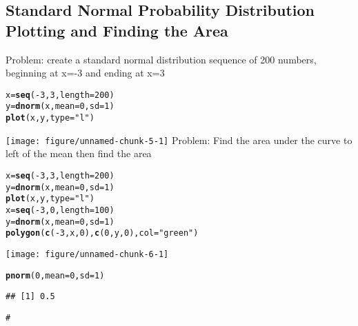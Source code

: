 \documentclass{article}\usepackage[]{graphicx}\usepackage[]{xcolor}
\makeatletter
\def\maxwidth{ %
  \ifdim\Gin@nat@width>\linewidth
    \linewidth
  \else
    \Gin@nat@width
  \fi
}
\newcommand{\hlnum}[1]{\textcolor[rgb]{0.686,0.059,0.569}{#1}}%
\newcommand{\hlsng}[1]{\textcolor[rgb]{0.192,0.494,0.8}{#1}}%
\newcommand{\hlcom}[1]{\textcolor[rgb]{0.678,0.584,0.686}{\textit{#1}}}%
\newcommand{\hlopt}[1]{\textcolor[rgb]{0,0,0}{#1}}%
\newcommand{\hldef}[1]{\textcolor[rgb]{0.345,0.345,0.345}{#1}}%
\newcommand{\hlkwb}[1]{\textcolor[rgb]{0.69,0.353,0.396}{#1}}%
\newcommand{\hlkwc}[1]{\textcolor[rgb]{0.333,0.667,0.333}{#1}}%
\newcommand{\hlkwd}[1]{\textcolor[rgb]{0.737,0.353,0.396}{\textbf{#1}}}%
\newenvironment{kframe}{%
 \def\at@end@of@kframe{}%
 \ifinner\ifhmode%
  \def\at@end@of@kframe{\end{minipage}}%
  \begin{minipage}{\columnwidth}%
 \fi\fi%
 \def\FrameCommand##1{\hskip\@totalleftmargin \hskip-\fboxsep
 \colorbox{shadecolor}{##1}\hskip-\fboxsep
     \hskip-\linewidth \hskip-\@totalleftmargin \hskip\columnwidth}%
 \MakeFramed {\advance\hsize-\width
   \@totalleftmargin\z@ \linewidth\hsize
   \@setminipage}}%
 {\par\unskip\endMakeFramed%
 \at@end@of@kframe}
\newenvironment{knitrout}{}{} %
\makeatother
\begin{document}
\subsection{Standard Normal Probability Distribution Plotting and Finding the Area}
Problem: \newline
create a standard normal distribution sequence of 200 numbers, beginning at x=-3 and ending at x=3
\begin{knitrout}
\color{fgcolor}\begin{kframe}
\begin{alltt}
\hldef{x}\hlkwb{=}\hlkwd{seq}\hldef{(}\hlopt{-}\hlnum{3}\hldef{,}\hlnum{3}\hldef{,}\hlkwc{length}\hldef{=}\hlnum{200}\hldef{)}
\hldef{y}\hlkwb{=}\hlkwd{dnorm}\hldef{(x,}\hlkwc{mean}\hldef{=}\hlnum{0}\hldef{,}\hlkwc{sd}\hldef{=}\hlnum{1}\hldef{)}
\hlkwd{plot}\hldef{(x,y,}\hlkwc{type}\hldef{=}\hlsng{"l"}\hldef{)}
\end{alltt}
\end{kframe}
\texttt{[image: figure/unnamed-chunk-5-1]} 
\end{knitrout}
Problem: \newline
Find the area under the curve to left of the mean then find the area
\begin{knitrout}
\color{fgcolor}\begin{kframe}
\begin{alltt}
\hldef{x}\hlkwb{=}\hlkwd{seq}\hldef{(}\hlopt{-}\hlnum{3}\hldef{,}\hlnum{3}\hldef{,}\hlkwc{length}\hldef{=}\hlnum{200}\hldef{)}
\hldef{y}\hlkwb{=}\hlkwd{dnorm}\hldef{(x,}\hlkwc{mean}\hldef{=}\hlnum{0}\hldef{,}\hlkwc{sd}\hldef{=}\hlnum{1}\hldef{)}
\hlkwd{plot}\hldef{(x,y,}\hlkwc{type}\hldef{=}\hlsng{"l"}\hldef{)}
\hldef{x}\hlkwb{=}\hlkwd{seq}\hldef{(}\hlopt{-}\hlnum{3}\hldef{,}\hlnum{0}\hldef{,}\hlkwc{length}\hldef{=}\hlnum{100}\hldef{)}
\hldef{y}\hlkwb{=}\hlkwd{dnorm}\hldef{(x,}\hlkwc{mean}\hldef{=}\hlnum{0}\hldef{,}\hlkwc{sd}\hldef{=}\hlnum{1}\hldef{)}
\hlkwd{polygon}\hldef{(}\hlkwd{c}\hldef{(}\hlopt{-}\hlnum{3}\hldef{,x,}\hlnum{0}\hldef{),}\hlkwd{c}\hldef{(}\hlnum{0}\hldef{,y,}\hlnum{0}\hldef{),}\hlkwc{col}\hldef{=}\hlsng{"green"}\hldef{)}
\end{alltt}
\end{kframe}
\texttt{[image: figure/unnamed-chunk-6-1]} 
\begin{kframe}\begin{alltt}
\hlkwd{pnorm}\hldef{(}\hlnum{0}\hldef{,}\hlkwc{mean}\hldef{=}\hlnum{0}\hldef{,}\hlkwc{sd}\hldef{=}\hlnum{1}\hldef{)}
\end{alltt}
\begin{verbatim}
## [1] 0.5
\end{verbatim}
\begin{alltt}
\hlcom{#}
\end{alltt}
\end{kframe}
\end{knitrout}
\end{document}

